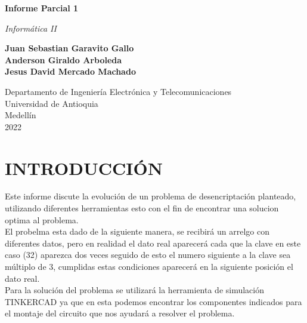 \documentclass{article}
\begin{document}
\begin{titlepage}
    \begin{center}
        \vspace*{1cm}
        
        \Huge
        \textbf{Informe Parcial 1}
            
        \vspace{0.5cm}
        \LARGE
       \textit{ Informática II}
            
        \vspace{1.5cm}
            
        \textbf{Juan Sebastian Garavito Gallo\\
        Anderson Giraldo Arboleda\\
        Jesus David Mercado Machado}
            
        \vfill
            
        \vspace{0.8cm}
            
        \Large
        Departamento de Ingeniería Electrónica y Telecomunicaciones\\
        Universidad de Antioquia\\
        Medellín\\
        2022
            
    \end{center}
\end{titlepage}

\tableofcontents





\newpage
\section{INTRODUCCIÓN}
Este informe discute la evolución de un problema de desencriptación planteado, utilizando diferentes herramientas esto con el fin de encontrar una solucion optima al problema.
\\

El probelma esta dado de la siguiente manera, se recibirá un arrelgo con diferentes datos, pero en realidad el dato real aparecerá cada que la clave en este caso (32) aparezca dos veces seguido de esto el numero siguiente a la clave sea múltiplo de 3, cumplidas estas condiciones aparecerá en la siguiente posición el dato real.
\\

Para la solución del problema se utilizará la herramienta de simulación TINKERCAD ya que en esta podemos encontrar los componentes indicados para el montaje del circuito que nos ayudará a resolver el problema. 
\\
\end{document}
